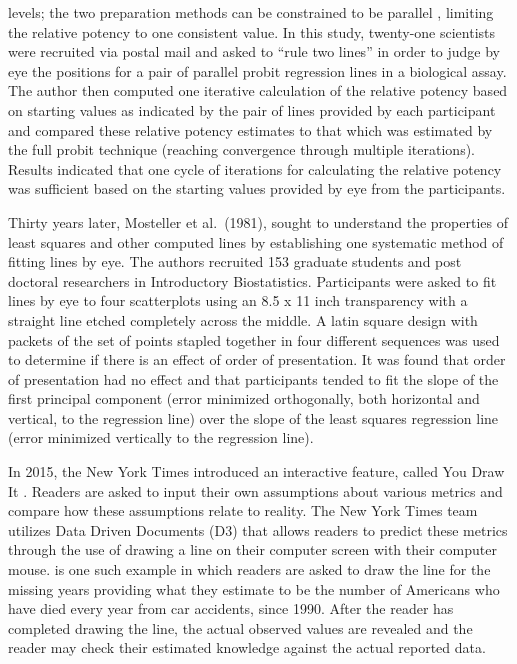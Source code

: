 \documentclass[12pt]{article}
\begin{document}
levels; the two preparation methods can be constrained to be parallel
\citep{jerne1949validity}, limiting the relative potency to one
consistent value. In this study, twenty-one scientists were recruited
via postal mail and asked to ``rule two lines'' in order to judge by eye
the positions for a pair of parallel probit regression lines in a
biological assay. The author then computed one iterative calculation of
the relative potency based on starting values as indicated by the pair
of lines provided by each participant and compared these relative
potency estimates to that which was estimated by the full probit
technique (reaching convergence through multiple iterations). Results
indicated that one cycle of iterations for calculating the relative
potency was sufficient based on the starting values provided by eye from
the participants.

Thirty years later, Mosteller et al.~(1981), sought to understand the
properties of least squares and other computed lines by establishing one
systematic method of fitting lines by eye. The authors recruited 153
graduate students and post doctoral researchers in Introductory
Biostatistics. Participants were asked to fit lines by eye to four
scatterplots using an 8.5 x 11 inch transparency with a straight line
etched completely across the middle. A latin square design
\citep{giesbrecht2004planning} with packets of the set of points stapled
together in four different sequences was used to determine if there is
an effect of order of presentation. It was found that order of
presentation had no effect and that participants tended to fit the slope
of the first principal component (error minimized orthogonally, both
horizontal and vertical, to the regression line) over the slope of the
least squares regression line (error minimized vertically to the
regression line).

In 2015, the New York Times introduced an interactive feature, called
You Draw It
\citep{aisch_cox_quealy_2015, buchanan_park_pearce_2017, katz_2017}.
Readers are asked to input their own assumptions about various metrics
and compare how these assumptions relate to reality. The New York Times
team utilizes Data Driven Documents (D3) that allows readers to predict
these metrics through the use of drawing a line on their computer screen
with their computer mouse. \citep{katz_2017} is one such example in
which readers are asked to draw the line for the missing years providing
what they estimate to be the number of Americans who have died every
year from car accidents, since 1990. After the reader has completed
drawing the line, the actual observed values are revealed and the reader
may check their estimated knowledge against the actual reported data.
\end{document}
